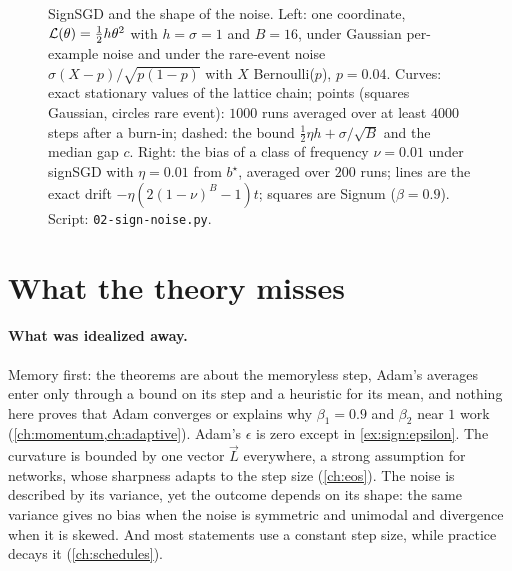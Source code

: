 \begin{refsection}
\begin{figure}[t]
\begin{fullwidth}
\end{fullwidth}
\caption{SignSGD and the shape of the noise. Left: one coordinate, $\mathcal{L}(\theta)=\frac12h\theta^2$ with $h=\sigma=1$ and $B=16$, under Gaussian per-example noise and under the rare-event noise $\sigma(X-p)/\sqrt{p(1-p)}$ with $X$ Bernoulli($p$), $p=0.04$. Curves: exact stationary values of the lattice chain; points (squares Gaussian, circles rare event): $1000$ runs averaged over at least $4000$ steps after a burn-in; dashed: the bound $\frac12\eta h+\sigma/\sqrt B$ and the median gap $c$. Right: the bias of a class of frequency $\nu=0.01$ under signSGD with $\eta=0.01$ from $b^\star$, averaged over $200$ runs; lines are the exact drift $-\eta(2(1-\nu)^B-1)t$; squares are Signum ($\beta=0.9$). Script: \texttt{02-sign-noise.py}.}
\label{fig:sign:noise}
\end{figure}

\section{What the theory misses}\label{sec:sign:misses}

\paragraph{What was idealized away.} Memory first: the theorems are about the memoryless step, Adam's averages enter only through a bound on its step and a heuristic for its mean, and nothing here proves that Adam converges or explains why $\beta_1=0.9$ and $\beta_2$ near $1$ work (\cref{ch:momentum,ch:adaptive}). Adam's $\epsilon$ is zero except in \cref{ex:sign:epsilon}. The curvature is bounded by one vector $\vec L$ everywhere, a strong assumption for networks, whose sharpness adapts to the step size (\cref{ch:eos}). The noise is described by its variance, yet the outcome depends on its shape: the same variance gives no bias when the noise is symmetric and unimodal and divergence when it is skewed. And most statements use a constant step size, while practice decays it (\cref{ch:schedules}).


\end{refsection}
